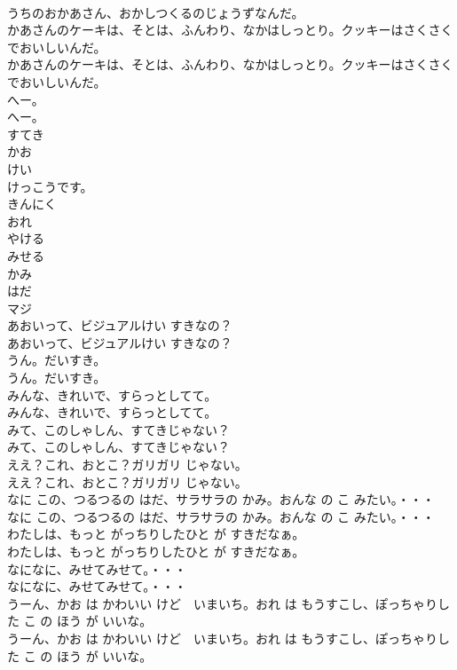 \documentclass[8pt]{extreport}
\begin{document}
\begin{CJK}{UTF8}{min}
\\	うちのおかあさん、おかしつくるのじょうずなんだ。
\\	かあさんのケーキは、そとは、ふんわり、なかはしっとり。クッキーはさくさくでおいしいんだ。
\\	かあさんのケーキは、そとは、ふんわり、なかはしっとり。クッキーはさくさくでおいしいんだ。
\\	へー。
\\	へー。
\\	すてき
\\	かお
\\	けい
\\	けっこうです。
\\	きんにく
\\	おれ
\\	やける
\\	みせる
\\	かみ
\\	はだ
\\	マジ
\\	あおいって、ビジュアルけい すきなの？
\\	あおいって、ビジュアルけい すきなの？
\\	うん。だいすき。
\\	うん。だいすき。
\\	みんな、きれいで、すらっとしてて。
\\	みんな、きれいで、すらっとしてて。
\\	みて、このしゃしん、すてきじゃない？
\\	みて、このしゃしん、すてきじゃない？
\\	ええ？これ、おとこ？ガリガリ じゃない。
\\	ええ？これ、おとこ？ガリガリ じゃない。
\\	なに この、つるつるの はだ、サラサラの かみ。おんな の こ みたい。・・・
\\	なに この、つるつるの はだ、サラサラの かみ。おんな の こ みたい。・・・
\\	わたしは、もっと がっちりしたひと が すきだなぁ。
\\	わたしは、もっと がっちりしたひと が すきだなぁ。
\\	なになに、みせてみせて。・・・
\\	なになに、みせてみせて。・・・
\\	うーん、かお は かわいい けど　いまいち。おれ は もうすこし、ぽっちゃりした こ の ほう が いいな。
\\	うーん、かお は かわいい けど　いまいち。おれ は もうすこし、ぽっちゃりした こ の ほう が いいな。

\end{CJK}
\end{document}
